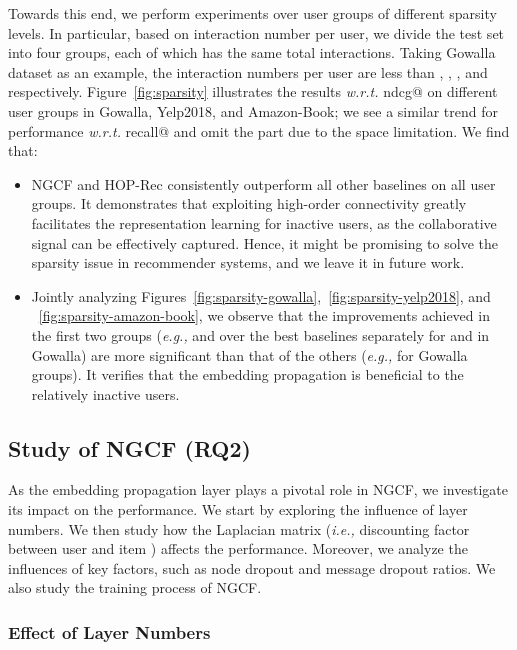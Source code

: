 \documentclass[sigconf]{acmart}
\newcommand{\ie}{\emph{i.e., }}
\newcommand{\eg}{\emph{e.g., }}
\newcommand{\wrt}{\emph{w.r.t. }}
\theoremstyle{definition}
\begin{document}
Towards this end, we perform experiments over user groups of different sparsity levels.
In particular, based on interaction number per user, we divide the test set into four groups, each of which has the same total interactions.
Taking Gowalla dataset as an example, the interaction numbers per user are less than , , , and  respectively.
Figure~\ref{fig:sparsity} illustrates the results \wrt ndcg@ on different user groups in Gowalla, Yelp2018, and Amazon-Book; 
we see a similar trend for performance \wrt recall@ and omit the part due to the space limitation.
We find that:
\begin{itemize}[leftmargin=*]
\item NGCF and HOP-Rec consistently outperform all other baselines on all user groups.
It demonstrates that exploiting high-order connectivity greatly facilitates the representation learning for inactive users, as the collaborative signal can be effectively captured.
Hence, it might be promising to solve the sparsity issue in recommender systems, and we leave it in future work.

\item Jointly analyzing Figures~\ref{fig:sparsity-gowalla},~\ref{fig:sparsity-yelp2018}, and ~\ref{fig:sparsity-amazon-book}, we observe that the improvements achieved in the first two groups (\eg  and  over the best baselines separately for  and  in Gowalla) are more significant than that of the others (\eg  for  Gowalla groups).
It verifies that the embedding propagation is beneficial to the relatively inactive users.
\end{itemize}


\subsection{Study of NGCF (RQ2)}
As the embedding propagation layer plays a pivotal role in NGCF, we investigate its impact on the performance.
We start by exploring the influence of layer numbers.
We then study how the Laplacian matrix (\ie discounting factor  between user  and item ) affects the performance.
Moreover, we analyze the influences of key factors, such as node dropout and message dropout ratios.
We also study the training process of NGCF.

\subsubsection{\textbf{Effect of Layer Numbers}}
\end{document}
